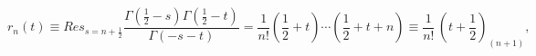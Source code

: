 \begin{equation}
r_n(t) \equiv
Res_{s=n+\frac{1}{2}}
\frac{\Gamma(\frac{
1}{2}-s)\Gamma(\frac{1}{2}-t)}{\Gamma(-s-t)}
= \frac{1}{n!}(\frac{1}{2}+t)\cdots
(\frac{1}{2}+t+n)
\equiv \frac{1}{n!}\, {\left( t+\frac{1}{2} \right) }_{(n+1)},
\label{1a}
\end{equation}

